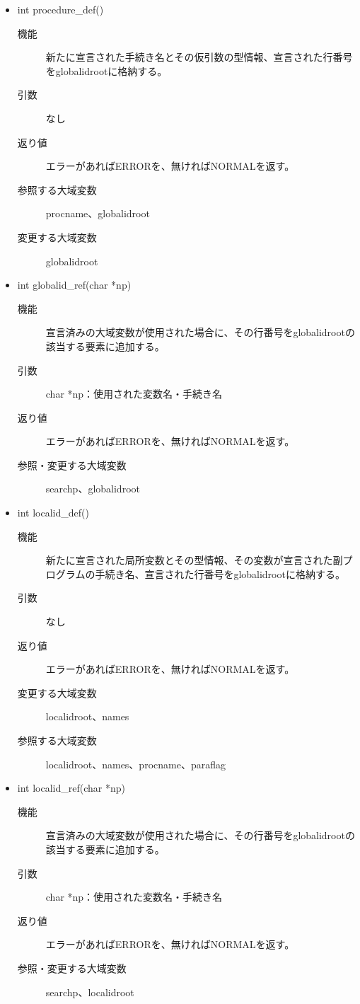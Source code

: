 \documentclass{jarticle}
\begin{document}
\begin{itemize}
\begin{description}
\end{description}
\item int procedure\_def()
\begin{description}
\item[機能]新たに宣言された手続き名とその仮引数の型情報、宣言された行番号をglobalidrootに格納する。
\item[引数]なし
\item[返り値]エラーがあればERRORを、無ければNORMALを返す。
\item[参照する大域変数]procname、globalidroot
\item[変更する大域変数]globalidroot
\end{description}
\item int globalid\_ref(char *np)
\begin{description}
\item[機能]宣言済みの大域変数が使用された場合に、その行番号をglobalidrootの該当する要素に追加する。
\item[引数]char *np：使用された変数名・手続き名
\item[返り値]エラーがあればERRORを、無ければNORMALを返す。
\item[参照・変更する大域変数]searchp、globalidroot
\end{description}
\item int localid\_def()
\begin{description}
\item[機能]新たに宣言された局所変数とその型情報、その変数が宣言された副プログラムの手続き名、宣言された行番号をglobalidrootに格納する。
\item[引数]なし
\item[返り値]エラーがあればERRORを、無ければNORMALを返す。
\item[変更する大域変数]localidroot、names
\item[参照する大域変数]localidroot、names、procname、paraflag
\end{description}
\item int localid\_ref(char *np)
\begin{description}
\item[機能]宣言済みの大域変数が使用された場合に、その行番号をglobalidrootの該当する要素に追加する。
\item[引数]char *np：使用された変数名・手続き名
\item[返り値]エラーがあればERRORを、無ければNORMALを返す。
\item[参照・変更する大域変数]searchp、localidroot
\end{description}

\end{itemize}
\end{document}
